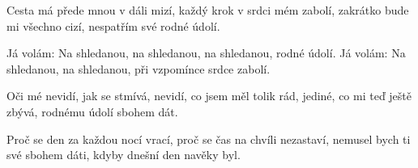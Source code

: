 
\beginverse{}
Cesta má přede mnou v dáli mizí,
každý krok v srdci mém zabolí,
zakrátko bude mi všechno cizí,
nespatřím své rodné údolí.
\endverse{}

\beginchorus{}
Já volám: Na shledanou, na shledanou,
na shledanou, rodné údolí.
Já volám: Na shledanou, na shledanou,
při vzpomínce srdce zabolí.
\endchorus{}

\beginverse{}
Oči mé nevidí, jak se stmívá,
nevidí, co jsem měl tolik rád,
jediné, co mi teď ještě zbývá,
rodnému údolí sbohem dát.
\endverse{}

\beginchorus{}
\phantom{}
\endchorus{}

\beginverse{}
Proč se den za každou nocí vrací,
proč se čas na chvíli nezastaví,
nemusel bych ti své sbohem dáti,
kdyby dnešní den navěky byl.
\endverse{}

\beginchorus{}
\phantom{}
\endchorus{}

\endsong{}
